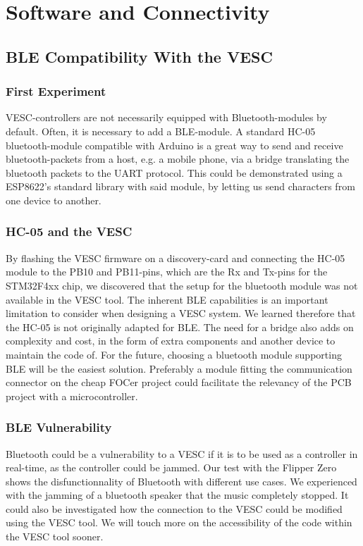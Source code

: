\section{Software and Connectivity}

\subsection{BLE Compatibility With the VESC}

\subsubsection{First Experiment}
VESC-controllers are not necessarily equipped with Bluetooth-modules by default. Often, it is necessary to add a BLE-module. A standard HC-05 bluetooth-module compatible with Arduino is a great way to send and receive bluetooth-packets from a host, e.g. a mobile phone, via a bridge translating the bluetooth packets to the UART protocol. This could be demonstrated using a ESP8622's standard library with said module, by letting us send characters from one device to another.

\subsubsection{HC-05 and the VESC}
By flashing the VESC firmware on a discovery-card and connecting the HC-05 module to the PB10 and PB11-pins, which are the Rx and Tx-pins for the STM32F4xx chip, we discovered that the setup for the bluetooth module was not available in the VESC tool. The inherent BLE capabilities is an important limitation to consider when designing a VESC system. We learned therefore that the HC-05 is not originally adapted for BLE. The need for a bridge also adds on complexity and cost, in the form of extra components and another device to maintain the code of. For the future, choosing a bluetooth module supporting BLE will be the easiest solution. Preferably a module fitting the communication connector on the cheap FOCer project \cite{shamansystems_cheap-focer-2firmware_nodate} could facilitate the relevancy of the PCB project with a microcontroller.

\subsubsection{BLE Vulnerability}
Bluetooth could be a vulnerability to a VESC if it is to be used as a controller in real-time, as the controller could be jammed. Our test with the Flipper Zero shows the disfunctionnality of Bluetooth with different use cases. We experienced with the jamming of a bluetooth speaker that the music completely stopped. It could also be investigated how the connection to the VESC could be modified using the VESC tool. We will touch more on the accessibility of the code within the VESC tool sooner.

